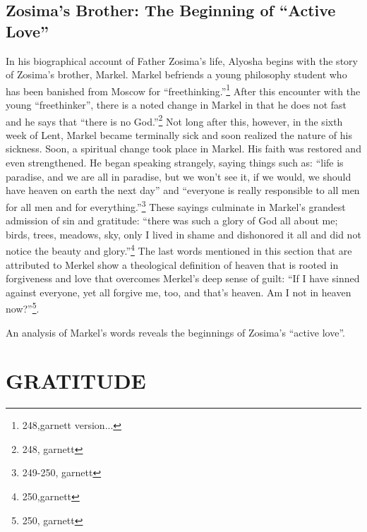 	\section{Zosima's Brother: The Beginning of ``Active Love''}
	In his biographical account of Father Zosima's life, Alyosha begins with the story of Zosima's brother, Markel. Markel befriends a young philosophy student who has been banished from Moscow for ``freethinking.''\footnote{248,garnett version...} After this encounter with the young ``freethinker'', there is a noted change in Markel in that he does not fast and he says that ``there is no God.''\footnote{248, garnett} Not long after this, however, in the sixth week of Lent, Markel became terminally sick and soon realized the nature of his sickness. Soon, a spiritual change took place in Markel. His faith was restored and even strengthened. He began speaking strangely, saying things such as: ``life is paradise, and we are all in paradise, but we won't see it, if we would, we should have heaven on earth the next day'' and ``everyone is really responsible to all men for all men and for everything.''\footnote{249-250, garnett} These sayings culminate in Markel's grandest admission of sin and gratitude: ``there was such a glory of God all about me; birds, trees, meadows, sky, only I lived in shame and dishonored it all and did not notice the beauty and glory.''\footnote{250,garnett} The last words mentioned in this section that are attributed to Merkel show a theological definition of heaven that is rooted in forgiveness and love that overcomes Merkel's deep sense of guilt: ``If I have sinned against everyone, yet all forgive me, too, and that's heaven. Am I not in heaven now?''\footnote{250, garnett}.
	
	An analysis of Markel's words reveals the beginnings of Zosima's ``active love''. 
	
	\chapter{GRATITUDE}




